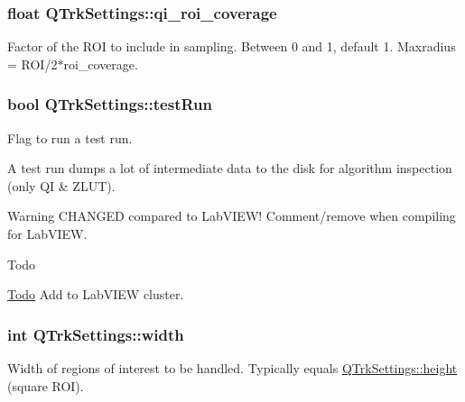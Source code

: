 \subsubsection[{\texorpdfstring{qi\+\_\+roi\+\_\+coverage}{qi_roi_coverage}}]{\setlength{\rightskip}{0pt plus 5cm}float Q\+Trk\+Settings\+::qi\+\_\+roi\+\_\+coverage}\hypertarget{struct_q_trk_settings_ab9567d21cc1517713a746c2173de4264}{}\label{struct_q_trk_settings_ab9567d21cc1517713a746c2173de4264}


Factor of the R\+OI to include in sampling. Between 0 and 1, default 1. Maxradius = R\+O\+I/2$\ast$roi\+\_\+coverage. 

\subsubsection[{\texorpdfstring{test\+Run}{testRun}}]{\setlength{\rightskip}{0pt plus 5cm}bool Q\+Trk\+Settings\+::test\+Run}\hypertarget{struct_q_trk_settings_aef52bd8e2fdba83af4ce3b4367180d9f}{}\label{struct_q_trk_settings_aef52bd8e2fdba83af4ce3b4367180d9f}


Flag to run a test run. 

A test run dumps a lot of intermediate data to the disk for algorithm inspection (only QI \& Z\+L\+UT). \begin{DoxyWarning}{Warning}
C\+H\+A\+N\+G\+ED compared to Lab\+V\+I\+E\+W! Comment/remove when compiling for Lab\+V\+I\+EW. 
\end{DoxyWarning}
\begin{DoxyRefDesc}{Todo}
\item[\hyperlink{todo__todo000001}{Todo}]Add to Lab\+V\+I\+EW cluster. \end{DoxyRefDesc}
\subsubsection[{\texorpdfstring{width}{width}}]{\setlength{\rightskip}{0pt plus 5cm}int Q\+Trk\+Settings\+::width}\hypertarget{struct_q_trk_settings_aef24eb3a4692bd67ff1aca8ef950e08d}{}\label{struct_q_trk_settings_aef24eb3a4692bd67ff1aca8ef950e08d}


Width of regions of interest to be handled. Typically equals \hyperlink{struct_q_trk_settings_a94c965d103e7a0a4f1fced8eee1324ce}{Q\+Trk\+Settings\+::height} (square R\+OI). 

